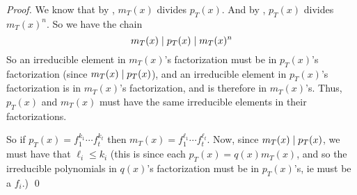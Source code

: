\begin{proof}

    We know that by , $m_T(x)$ divides $p_T(x)$.
    And by , $p_T(x)$ divides $m_T(x)^n$.
    So we have the chain
    \[ m_T(x) \mid p_T(x) \mid m_T(x)^n \]
    So an irreducible element in $m_T(x)$'s factorization must be in $p_T(x)$'s factorization (since $m_T(x)\mid p_T(x)$), and an irreducible element in $p_T(x)$'s factorization is in $m_T(x)$'s
    factorization, and is therefore in $m_T(x)$'s.
    Thus, $p_T(x)$ and $m_T(x)$ must have the same irreducible elements in their factorizations.

    So if $p_T(x)=f_1^{k_1}\cdots f_t^{k_t}$ then $m_T(x)=f_1^{\ell_1}\cdots f_t^{\ell_t}$.
    Now, since $m_T(x)\mid p_T(x)$, we must have that $\ell_i\leq k_i$ (this is since each $p_T(x)=q(x)m_T(x)$, and so the irreducible polynomials in $q(x)$'s factorization must be in $p_T(x)$'s, ie
    must be a $f_i$.)
    \qed

\end{proof}

